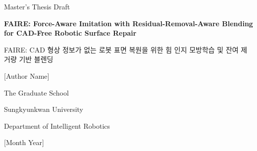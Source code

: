 \documentclass[12pt]{article}
\begin{document}
\begin{center}
{\Large Master's Thesis Draft}\par
\vspace{3.5cm}
{\LARGE\bfseries FAIRE: Force-Aware Imitation with Residual-Removal-Aware Blending for CAD-Free Robotic Surface Repair}\par
\vspace{1.2cm}
{\large FAIRE: CAD 형상 정보가 없는 로봇 표면 복원을 위한 힘 인지 모방학습 및 잔여 제거량 기반 블렌딩}\par
\vspace{3.2cm}
{\Large [Author Name]}\par
\vfill
{\Large The Graduate School}\par\vspace{0.4cm}
{\Large Sungkyunkwan University}\par\vspace{0.4cm}
{\large Department of Intelligent Robotics}\par
\vspace{1.2cm}
{\large [Month Year]}\par
\end{center}
\end{document}
